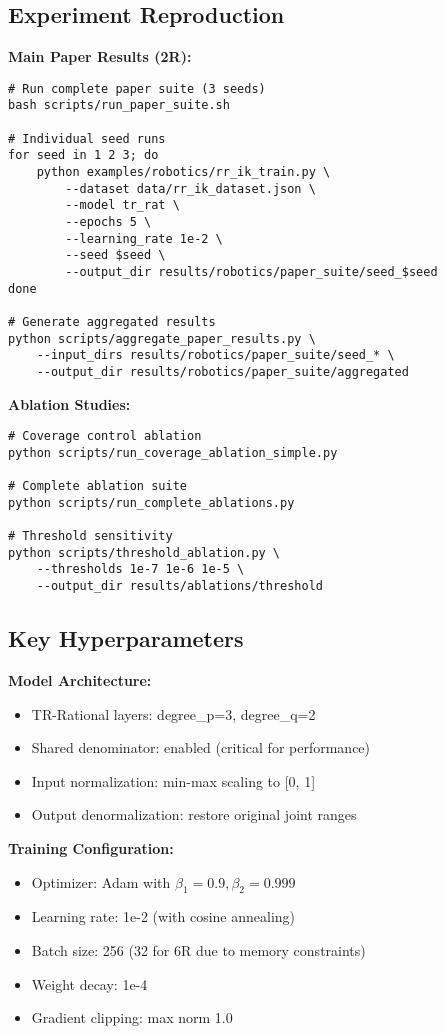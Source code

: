 \documentclass[twoside,11pt]{article}
\begin{document}
\subsection{Experiment Reproduction}

\textbf{Main Paper Results (2R):}
\begin{verbatim}
# Run complete paper suite (3 seeds)
bash scripts/run_paper_suite.sh

# Individual seed runs
for seed in 1 2 3; do
    python examples/robotics/rr_ik_train.py \
        --dataset data/rr_ik_dataset.json \
        --model tr_rat \
        --epochs 5 \
        --learning_rate 1e-2 \
        --seed $seed \
        --output_dir results/robotics/paper_suite/seed_$seed
done

# Generate aggregated results
python scripts/aggregate_paper_results.py \
    --input_dirs results/robotics/paper_suite/seed_* \
    --output_dir results/robotics/paper_suite/aggregated
\end{verbatim}

\textbf{Ablation Studies:}
\begin{verbatim}
# Coverage control ablation
python scripts/run_coverage_ablation_simple.py

# Complete ablation suite
python scripts/run_complete_ablations.py

# Threshold sensitivity
python scripts/threshold_ablation.py \
    --thresholds 1e-7 1e-6 1e-5 \
    --output_dir results/ablations/threshold
\end{verbatim}

\subsection{Key Hyperparameters}

\textbf{Model Architecture:}
\begin{itemize}
\item TR-Rational layers: degree\_p=3, degree\_q=2
\item Shared denominator: enabled (critical for performance)
\item Input normalization: min-max scaling to [0, 1]
\item Output denormalization: restore original joint ranges
\end{itemize}

\textbf{Training Configuration:}
\begin{itemize}
\item Optimizer: Adam with $\beta_1=0.9, \beta_2=0.999$
\item Learning rate: 1e-2 (with cosine annealing)
\item Batch size: 256 (32 for 6R due to memory constraints)
\item Weight decay: 1e-4
\item Gradient clipping: max norm 1.0
\end{itemize}
\end{document}
